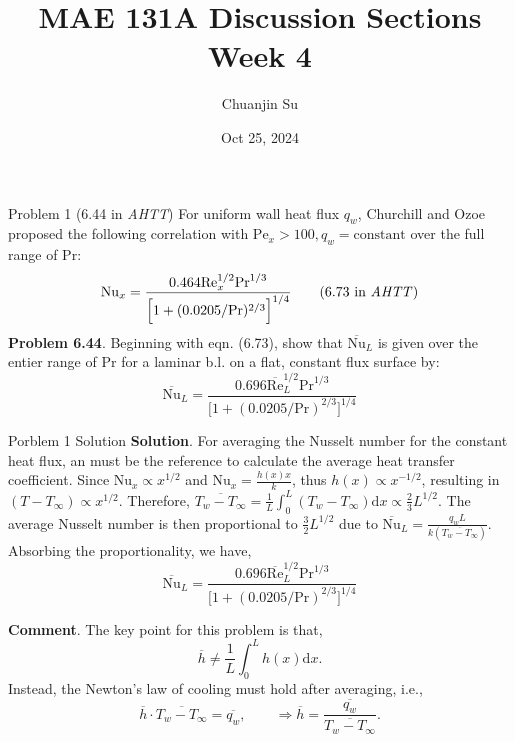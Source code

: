 \documentclass[9pt, aspectratio=169, handout]{beamer}
\title{MAE 131A Discussion Sections\\ Week 4}
\author{Chuanjin Su}
\institute[UCLA MAE]{Mechanical and Aerospace Engineering Department\\
    University of California, Los Angeles}
\date{Oct 25, 2024}
\begin{document}
\begin{frame}
    \titlepage
\end{frame}

\begin{frame}{Problem 1 (6.44 in \textit{AHTT})}
    For uniform wall heat flux $q_w$, Churchill and Ozoe proposed the following correlation with $\mathrm{Pe}_x > 100, q_w = \text{constant}$ over the full range of $\mathrm{Pr}$:
    \begin{equation}
        \mathrm{Nu}_x = \frac{0.464\mathrm{Re}_x^{1/2}\mathrm{Pr}^{1/3}}{\Big[1 + (0.0205 / \mathrm{Pr})^{2/3}\Big]^{1/4}}
        \tag{6.73 in \textit{AHTT}}
    \end{equation}
    \textbf{Problem 6.44}. Beginning with eqn. (6.73), show that $\overline{\mathrm{Nu}}_L$ is given over the entier range of $\mathrm{Pr}$ for a laminar b.l. on a flat, constant flux surface by:
    \begin{equation}
        \overline{\mathrm{Nu}}_L = \frac{0.696\overline{\mathrm{Re}}_L^{1/2}\mathrm{Pr}^{1/3}}{\Big[1 + (0.0205 / \mathrm{Pr})^{2/3}\Big]^{1/4}}
    \end{equation}
\end{frame}

\begin{frame}{Porblem 1 Solution}
    \textbf{Solution}. For averaging the Nusselt number for the constant heat flux, an  must be the reference to calculate the average heat transfer coefficient. Since $\mathrm{Nu}_x\propto x^{1/2}$ and $\mathrm{Nu}_x = \frac{h(x)x}{k}$, thus $h(x)\propto x^{-1/2}$, resulting in $(T-T_{\infty})\propto x^{1/2}$. Therefore, $\overline{T_w - T_{\infty}} = \frac{1}{L}\int_0^L (T_w - T_{\infty}) \mathrm{d}x \propto \frac{2}{3}L^{1/2}$. The average Nusselt number is then proportional to $\frac{3}{2}L^{1/2}$ due to $\overline{\mathrm{Nu}}_L = \frac{q_w L}{k(\overline{T_w - T_{\infty}})}$. Absorbing the proportionality, we have,
    \begin{equation}
        \overline{\mathrm{Nu}}_L = \frac{0.696\overline{\mathrm{Re}}_L^{1/2}\mathrm{Pr}^{1/3}}{\Big[1 + (0.0205 / \mathrm{Pr})^{2/3}\Big]^{1/4}}
    \end{equation}
    \hfill\qedsymbol

    \textbf{Comment}. The key point for this problem is that,
    \begin{equation}
        \overline{h} \neq \frac{1}{L}\int_0^L h(x) \mathrm{d}x.
    \end{equation}
    Instead, the Newton's law of cooling must hold after averaging, i.e.,
    \begin{equation}
        \overline{h} \cdot \overline{T_w - T_{\infty}} = \overline{q_w}, \qquad\Rightarrow \overline{h} = \frac{\overline{q_w}}{\overline{T_w - T_{\infty}}}.
    \end{equation}
\end{frame}
\end{document}
